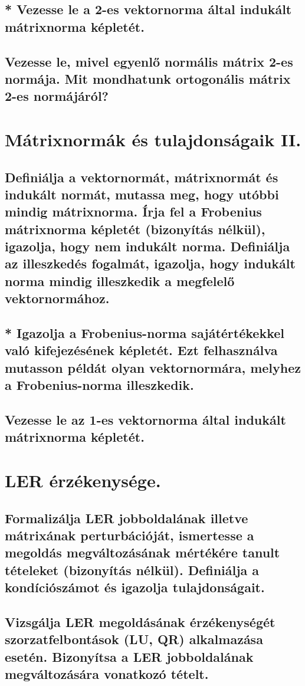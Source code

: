 \documentclass{article}
\begin{document}
        \subsection{* Vezesse le a 2-es vektornorma által indukált mátrixnorma képletét.}
        \subsection{Vezesse le, mivel egyenlő normális mátrix 2-es normája. Mit mondhatunk ortogonális mátrix 2-es normájáról?}


    \section{Mátrixnormák és tulajdonságaik II.}
        \subsection{Definiálja a vektornormát, mátrixnormát és indukált normát, mutassa meg, hogy utóbbi mindig mátrixnorma. Írja fel a Frobenius mátrixnorma képletét (bizonyítás nélkül), igazolja, hogy nem indukált norma. Definiálja az illeszkedés fogalmát, igazolja, hogy indukált norma mindig illeszkedik a megfelelő vektornormához.}
        \subsection{* Igazolja a Frobenius-norma sajátértékekkel való kifejezésének képletét. Ezt felhasználva mutasson példát olyan vektornormára, melyhez a Frobenius-norma illeszkedik.}
        \subsection{Vezesse le az 1-es vektornorma által indukált mátrixnorma képletét.}

    
    \section{LER érzékenysége.}
        \subsection{Formalizálja LER jobboldalának illetve mátrixának perturbációját, ismertesse a megoldás megváltozásának mértékére tanult tételeket (bizonyítás nélkül). Definiálja a kondíciószámot és igazolja tulajdonságait.}
        \subsection{Vizsgálja LER megoldásának érzékenységét szorzatfelbontások (LU, QR) alkalmazása esetén. Bizonyítsa a LER jobboldalának megváltozására vonatkozó tételt.}
\end{document}
